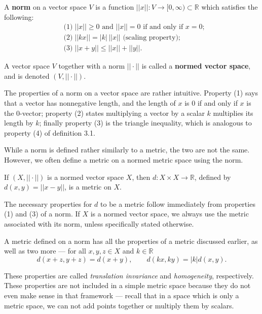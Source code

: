 \begin{defn}
A \textbf{norm} on a vector space $V$ is a function $||x||: V \rightarrow [0, \infty) \subset \mathbb{R}$ which satisfies the following:
\begin{align*}
&\textrm{(1)}\; ||x|| \geq 0 \textrm{ and } ||x|| = 0 \textrm{ if and only if } x=0;\\
&\textrm{(2)}\; ||kx|| = |k|\,||x|| \textrm{ (scaling property)};\\
&\textrm{(3)}\; ||x + y|| \leq ||x|| + ||y||.
\end{align*}
\end{defn}

\begin{defn}
A vector space $V$ together with a norm $||\cdot||$ is called a \textbf{normed vector space}, and is denoted $(V, ||\cdot||)$.
\end{defn}

The properties of a norm on a vector space are rather intuitive.  Property (1) says that a vector has nonnegative length, and the length of $x$ is 0 if and only if $x$ is the 0-vector; property (2) states multiplying a vector by a scalar $k$ multiplies its length by $k$; finally property (3) is the triangle inequality, which is analogous to property (4) of definition 3.1.

While a norm is defined rather similarly to a metric, the two are not the same.  However, we often define a metric on a normed metric space using the norm.

\begin{prop}
If $(X, ||\cdot||)$ is a normed vector space $X$, then $d: X \times X \rightarrow \mathbb{R}$, defined by $d(x,y) = ||x - y||$, is a metric on $X$.
\end{prop}

The necessary properties for $d$ to be a metric follow immediately from properties (1) and (3) of a norm.  If $X$ is a normed vector space, we always use the metric associated with its norm, unless specifically stated otherwise.

A metric defined on a norm has all the properties of a metric discussed earlier, as well as two more --- for all $x, y, z \in X$ and $k \in \mathbb{R}$
\[d(x+z, y+z) = d(x+y), \qquad d(kx, ky) = |k|d(x,y).\]

These properties are called \textit{translation invariance} and \textit{homogeneity}, respectively.  These properties are not included in a simple metric space because they do not even make sense in that framework --- recall that in a space which is only a metric space, we can not add points together or multiply them by scalars.

